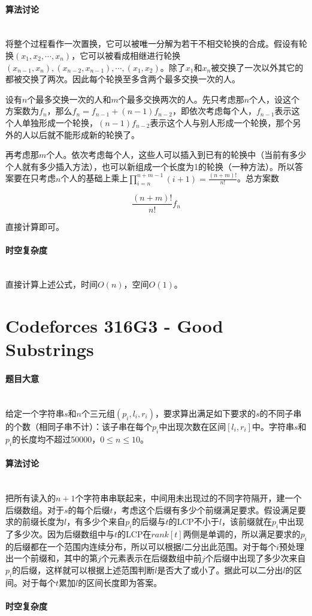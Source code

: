 \documentclass[UTF8]{ctexart}
\newcommand{\myparagraph}[1]{\paragraph{#1}\mbox{}\\}
\theoremstyle{nonumberplain}
\begin{document}
		\myparagraph{算法讨论}
		
			将整个过程看作一次置换，它可以被唯一分解为若干不相交轮换的合成。假设有轮换$(x_1,x_2,\cdots,x_n)$，它可以被看成相继进行轮换$(x_{n-1},x_n),(x_{n-2},x_{n-1}),\cdots,(x_1,x_2)$。除了$x_1$和$x_n$被交换了一次以外其它的都被交换了两次。因此每个轮换至多含两个最多交换一次的人。
			
			设有$n$个最多交换一次的人和$m$个最多交换两次的人。先只考虑那$n$个人，设这个方案数为$f_n$，那么$f_n=f_{n-1}+(n-1)f_{n-2}$，即依次考虑每个人，$f_{n-1}$表示这个人单独形成一个轮换，$(n-1)f_{n-2}$表示这个人与别人形成一个轮换，那个另外的人以后就不能形成新的轮换了。
			
			再考虑那$m$个人。依次考虑每个人，这些人可以插入到已有的轮换中（当前有多少个人就有多少插入方法），也可以新组成一个长度为1的轮换（一种方法）。所以答案要在只考虑$n$个人的基础上乘上$\prod_{i=n}^{n+m-1}(i+1)=\frac{(n+m)!}{n!}$。总方案数
			
			$$\frac{(n+m)!}{n!}f_n$$
			
			直接计算即可。
		
		\myparagraph{时空复杂度}
		
			直接计算上述公式，时间$O(n)$，空间$O(1)$。
	
	\section{Codeforces 316G3 - Good Substrings}
		
		\myparagraph{题目大意}
		
			给定一个字符串$s$和$n$个三元组$(p_i,l_i,r_i)$，要求算出满足如下要求的$s$的不同子串的个数（相同子串不计）：该子串在每个$p_i$中出现次数在区间$[l_i,r_i]$中。字符串$s$和$p_i$的长度均不超过50000，$0 \leq n \leq 10$。
		
		\myparagraph{算法讨论}
		
			把所有读入的$n+1$个字符串串联起来，中间用未出现过的不同字符隔开，建一个后缀数组。对于$s$的每个后缀$t$，考虑这个后缀有多少个前缀满足要求。假设满足要求的前缀长度为$l$，有多少个来自$p_i$的后缀与$t$的LCP不小于$l$，该前缀就在$p_i$中出现了多少次。因为后缀数组中与$t$的LCP在$rank[t]$两侧是单调的，所以满足要求的$p_i$的后缀都在一个范围内连续分布，所以可以根据$l$二分出此范围。对于每个$i$预处理出一个前缀和，其中的第$j$个元素表示在后缀数组中前$j$个后缀中出现了多少次来自$p_i$的后缀，这样就可以根据上述范围判断$l$是否大了或小了。据此可以二分出$l$的区间。对于每个$t$累加$l$的区间长度即为答案。
		
		\myparagraph{时空复杂度}
		
\end{document}
